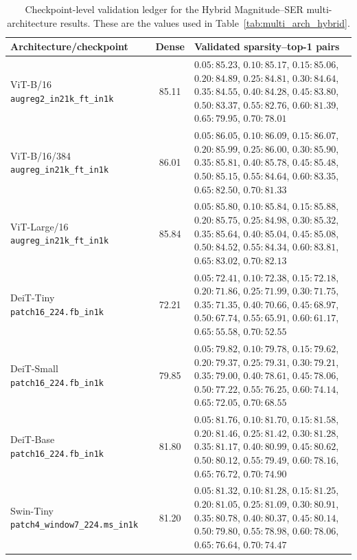 \documentclass[11pt]{article}
\theoremstyle{plain}
\theoremstyle{definition}
\theoremstyle{remark}
\newcommand{\1}{\mathbf{1}}
\begin{document}
\begin{table}[ht]
\centering
\caption{Checkpoint-level validation ledger for the Hybrid Magnitude--SER multi-architecture results.  These are the values used in Table~\ref{tab:multi_arch_hybrid}.}
\label{tab:checkpoint_validation_ledger}
\scriptsize
\setlength{\tabcolsep}{3pt}
\begin{tabularx}{\textwidth}{p{4.0cm}cX}
\toprule
Architecture/checkpoint & Dense & Validated sparsity--top-1 pairs \\
\midrule
ViT-B/16 \texttt{augreg2\_in21k\_ft\_in1k}
& 85.11
& \(0.05:85.23\), \(0.10:85.17\), \(0.15:85.06\), \(0.20:84.89\), \(0.25:84.81\), \(0.30:84.64\), \(0.35:84.55\), \(0.40:84.28\), \(0.45:83.80\), \(0.50:83.37\), \(0.55:82.76\), \(0.60:81.39\), \(0.65:79.95\), \(0.70:78.01\) \\
ViT-B/16/384 \texttt{augreg\_in21k\_ft\_in1k}
& 86.01
& \(0.05:86.05\), \(0.10:86.09\), \(0.15:86.07\), \(0.20:85.99\), \(0.25:86.00\), \(0.30:85.90\), \(0.35:85.81\), \(0.40:85.78\), \(0.45:85.48\), \(0.50:85.15\), \(0.55:84.64\), \(0.60:83.35\), \(0.65:82.50\), \(0.70:81.33\) \\
ViT-Large/16 \texttt{augreg\_in21k\_ft\_in1k}
& 85.84
& \(0.05:85.80\), \(0.10:85.84\), \(0.15:85.88\), \(0.20:85.75\), \(0.25:84.98\), \(0.30:85.32\), \(0.35:85.64\), \(0.40:85.04\), \(0.45:85.08\), \(0.50:84.52\), \(0.55:84.34\), \(0.60:83.81\), \(0.65:83.02\), \(0.70:82.13\) \\
DeiT-Tiny \texttt{patch16\_224.fb\_in1k}
& 72.21
& \(0.05:72.41\), \(0.10:72.38\), \(0.15:72.18\), \(0.20:71.86\), \(0.25:71.99\), \(0.30:71.75\), \(0.35:71.35\), \(0.40:70.66\), \(0.45:68.97\), \(0.50:67.74\), \(0.55:65.91\), \(0.60:61.17\), \(0.65:55.58\), \(0.70:52.55\) \\
DeiT-Small \texttt{patch16\_224.fb\_in1k}
& 79.85
& \(0.05:79.82\), \(0.10:79.78\), \(0.15:79.62\), \(0.20:79.37\), \(0.25:79.31\), \(0.30:79.21\), \(0.35:79.00\), \(0.40:78.61\), \(0.45:78.06\), \(0.50:77.22\), \(0.55:76.25\), \(0.60:74.14\), \(0.65:72.05\), \(0.70:68.55\) \\
DeiT-Base \texttt{patch16\_224.fb\_in1k}
& 81.80
& \(0.05:81.76\), \(0.10:81.70\), \(0.15:81.58\), \(0.20:81.46\), \(0.25:81.42\), \(0.30:81.28\), \(0.35:81.17\), \(0.40:80.99\), \(0.45:80.62\), \(0.50:80.12\), \(0.55:79.49\), \(0.60:78.16\), \(0.65:76.72\), \(0.70:74.90\) \\
Swin-Tiny \texttt{patch4\_window7\_224.ms\_in1k}
& 81.20
& \(0.05:81.32\), \(0.10:81.28\), \(0.15:81.25\), \(0.20:81.05\), \(0.25:81.09\), \(0.30:80.91\), \(0.35:80.78\), \(0.40:80.37\), \(0.45:80.14\), \(0.50:79.80\), \(0.55:78.98\), \(0.60:78.06\), \(0.65:76.64\), \(0.70:74.47\) \\

\end{tabularx}
\end{table}
\end{document}
